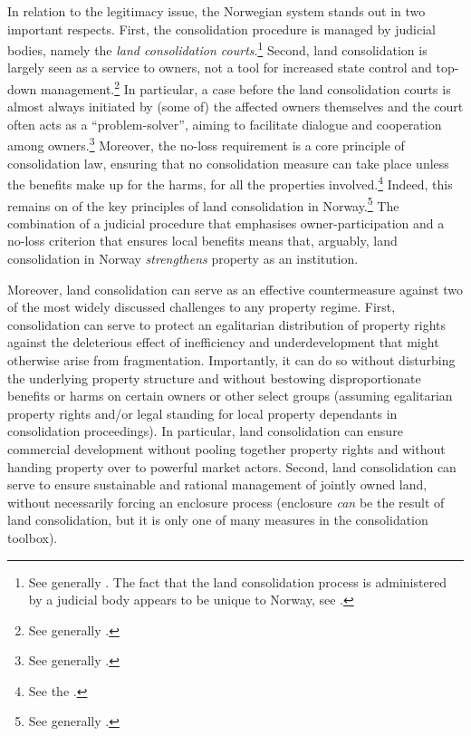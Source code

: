 In relation to the legitimacy issue, the Norwegian system stands out in two important respects. First, the consolidation procedure is managed by judicial bodies, namely the {\it land consolidation courts}.\footnote{See generally \cite{langbach09}. The fact that the land consolidation process is administered by a judicial body appears to be unique to Norway, see \cite[45]{sky01}.} Second, land consolidation is largely seen as a service to owners, not a tool for increased state control and top-down management.\footnote{See generally \cite{sky09}.} In particular, a case before the land consolidation courts is almost always initiated by (some of) the affected owners themselves and the court often acts as a ``problem-solver'', aiming to facilitate dialogue and cooperation among owners.\footnote{See generally \cite{rognes98,rognes03,rognes07}.} Moreover, the no-loss requirement is a core principle of consolidation law, ensuring that no consolidation measure can take place unless the benefits make up for the harms, for all the properties involved.\footnote{See the \cite[3 a)]{lca79}.} Indeed, this remains on of the key principles of land consolidation in Norway.\footnote{See generally \cite{rygg98}.} The combination of a judicial procedure that emphasises owner-participation and a no-loss criterion that ensures local benefits means that, arguably, land consolidation in Norway {\it strengthens} property as an institution.

Moreover, land consolidation can serve as an effective countermeasure against two of the most widely discussed challenges to any property regime. First, consolidation can serve to protect an egalitarian distribution of property rights against the deleterious effect of inefficiency and underdevelopment that might otherwise arise from fragmentation. Importantly, it can do so without disturbing the underlying property structure and without bestowing disproportionate benefits or harms on certain owners or other select groups (assuming egalitarian property rights and/or legal standing for local property dependants in consolidation proceedings). In particular, land consolidation can ensure commercial development without pooling together property rights and without handing property over to powerful market actors. Second, land consolidation can serve to ensure sustainable and rational management of jointly owned land, without necessarily forcing an enclosure process (enclosure {\it can} be the result of land consolidation, but it is only one of many measures in the consolidation toolbox). 

